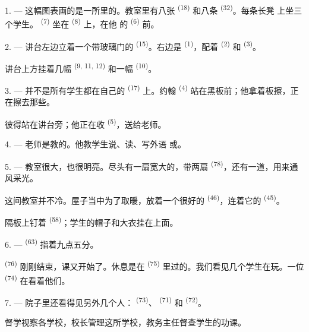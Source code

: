 1. --- 这幅图表画的是一所里的。教室里有八张
 \textsuperscript{(18)} 和八条 \textsuperscript{(32)}。每条长凳
上坐三个学生。 \textsuperscript{(7)} 坐在 \textsuperscript{(8)} 上，在他
的 \textsuperscript{(6)} 前。

2. --- 讲台左边立着一个带玻璃门的 \textsuperscript{(15)}。右边是
 \textsuperscript{(1)}，配着 \textsuperscript{(2)} 和
 \textsuperscript{(3)}。

讲台上方挂着几幅 \textsuperscript{(9, 11, 12)} 和一幅
\textsuperscript{(10)}。

3. --- 并不是所有学生都在自己的 \textsuperscript{(17)} 上。约翰
\textsuperscript{(4)} 站在黑板前；他拿着板擦，正在擦去那些。

彼得站在讲台旁；他正在收 \textsuperscript{(5)}，送给老师。

4. --- 老师是教的。他教学生说、读、写外语
或。

5. --- 教室很大，也很明亮。尽头有一扇宽大的，带两扇
 \textsuperscript{(78)}，还有一道，用来通风采光。

这间教室并不冷。屋子当中为了取暖，放着一个很好的
\textsuperscript{(46)}，连着它的 \textsuperscript{(45)}。

隔板上钉着 \textsuperscript{(58)}；学生的帽子和大衣挂在上面。

\VUsaut{5.2mm}
\VUsaut{3.6mm}

6. ---  \textsuperscript{(63)} 指着九点五分。

 \textsuperscript{(76)} 刚刚结束，课又开始了。休息是在
 \textsuperscript{(75)} 里过的。我们看见几个学生在玩。一位
 \textsuperscript{(74)} 在看着他们。

7. --- 院子里还看得见另外几个人： \textsuperscript{(73)}、
 \textsuperscript{(71)} 和 \textsuperscript{(72)}。

督学视察各学校，校长管理这所学校，教务主任督查学生的功课。

